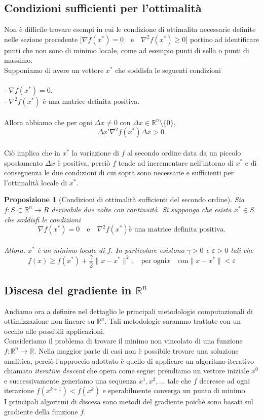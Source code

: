 \documentclass[a4paper, 12pt]{article}
\newtheorem{prop}{Proposizione}
\begin{document}
\subsection{Condizioni sufficienti per l'ottimalità}
Non è difficile trovare esempi in cui le condizione di ottimalita necessarie definite nelle sezione precedente
[$\nabla f(x^\ast) = 0 \quad \mbox{e} \quad \nabla^2 f(x^\ast) \geq 0$]
portino ad identificare punti che non sono di minimo locale, come ad esempio punti di sella o punti di massimo.\\
Supponiamo di avere un vettore $x^\ast$ che soddisfa le seguenti condizioni\\\\
- $\nabla f(x^\ast) = 0$.\\
- $\nabla^2 f(x^\ast)$ è una matrice definita positiva.\\\\
Allora abbiamo che per ogni $\Delta x \neq 0$ con $\Delta x \in \mathbb{R}^n \setminus \{0\}$,\\
\[\Delta x' \nabla^2f(x^\ast) \Delta x > 0.\]\\
Ciò implica che in $x^\ast$ la variazione di $f$ al secondo ordine data da un piccolo spostamento $\Delta x$ è positiva, perciò $f$ tende ad incrementare nell'intorno di $x^\ast$ e di conseguenza le due condizioni di cui sopra sono necessarie e sufficienti per l'ottimalità locale di $x^\ast$.
\begin{prop}[Condizioni di ottimalità sufficienti del secondo ordine] Sia $f:S \subset \mathbb{R}^n \to R$ derivabile due volte con continuità. Si supponga che esista $x^\ast \in S$ che soddisfi le condizioni\\
\[\nabla f(x^\ast) = 0 \quad \mbox{e} \quad \nabla^2 f(x^\ast) \mbox{è una matrice definita positiva.}\]\\
Allora, $x^\ast$ è un minimo locale di $f$. In particolare esistono $\gamma > 0$ e $\varepsilon > 0$ tali che\\
\[ f(x) \geq f(x^\ast) + \frac{\gamma}{2} \parallel x - x^\ast \parallel^2, \quad \mbox{per ogni} x \quad \mbox{con} \parallel x - x^\ast \parallel < \varepsilon  \]
\end{prop}
\subsection{Discesa del gradiente in $\mathbb{R}^n$}
Andiamo ora a definire nel dettaglio le principali metodologie computazionali di ottimizzazione non lineare su $\mathbb{R}^n$. Tali metodologie sarannno trattate con un occhio alle possibili applicazioni.\\
Consideriamo il problema di trovare il minimo non vincolato di una funzione $f:\mathbb{R}^n \to \mathbb{R}$. Nella maggior parte di casi non è possibile trovare una soluzione analitica, perciò l'approccio adottato è quello di applicare un algoritmo iterativo chiamato \textit{iterative descent} che opera come segue: prendiamo un vettore iniziale $x^0$ e successivamente generiamo una sequenza $x^1, x^2, ...$ tale che $f$ decresce ad ogni iterazione $f(x^{k+1}) < f(x^k)$ e sperabilmente converga un punto di minimo.\\
I principali algoritmi di discesa sono metodi del gradiente poichè sono basati sul gradiente della funzione $f$.
\end{document}
